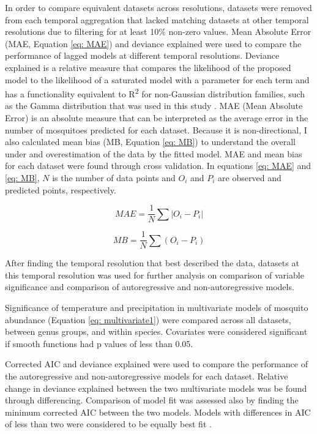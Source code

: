 In order to compare equivalent datasets across resolutions, datasets were removed from each temporal aggregation that lacked matching datasets at other temporal resolutions due to filtering for at least 10\% non-zero values. Mean Absolute Error (MAE, Equation \ref{eq: MAE}) and deviance explained were used to compare the performance of lagged models at different temporal resolutions.  Deviance explained is a relative measure that compares the likelihood of the proposed model to the likelihood of a saturated model with a parameter for each term and has a functionality equivalent to R\textsuperscript{2} for non-Gaussian distribution families, such as the Gamma distribution that was used in this study \citep{Nelder1972}. MAE (Mean Absolute Error) is an absolute measure that can be interpreted as the average error in the number of mosquitoes predicted for each dataset. Because it is non-directional, I also calculated mean bias (MB, Equation \ref{eq: MB}) to understand the overall under and overestimation of the data by the fitted model. MAE and mean bias for each dataset were found through cross validation.  In equations \ref{eq: MAE} and \ref{eq: MB}, $N$ is the number of data points and $O_i$ and $P_i$ are observed and predicted points, respectively. 

\begin{equation}
MAE = \frac{1}{N}\sum{|O_i - P_i|}
\label{eq: MAE}
\end{equation}

\begin{equation}
MB = \frac{1}{N}\sum{(O_i - P_i)}
\label{eq: MB}
\end{equation}

After finding the temporal resolution that best described the data, datasets at this temporal resolution was used for further analysis on comparison of variable significance and comparison of autoregressive and non-autoregressive models.%

Significance of temperature and precipitation in multivariate models of mosquito abundance (Equation \ref{eq: multivariate1}) were compared across all datasets, between genus groups, and within species. Covariates were considered significant if smooth functions had p values of less than 0.05. %

Corrected AIC and deviance explained were used to compare the performance of the autoregressive and non-autoregressive models for each dataset. Relative change in deviance explained between the two multivariate models was be found through differencing. Comparison of model fit was assessed also by finding the minimum corrected AIC between the two models. Models with differences in AIC of less than two were considered to be equally best fit \citep{JOHNSON2004101}.





